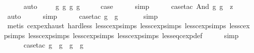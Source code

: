 \begin{isabellebody}
\ \ \ \ \isamarkupfalse%
\ auto\isanewline
{}\isamarkupfalse%
\isanewline
\ \ \isamarkupfalse%
\ {\isacharparenleft}{}{}\ g{}\ g{}\ g{}{\isacharprime}\ g{}{\isacharprime}{\isacharparenright}\isanewline
\ \ \isamarkupfalse%
\ \isamarkupfalse%
\ {\isacharquery}case\isanewline
\ \ \ \ \isamarkupfalse%
\ simp\isanewline
\ \ \ \ \isamarkupfalse%
\ {\isacharparenleft}case{\isacharunderscore}tac\ {\isachardoublequoteopen}And\ g{}{\isacharprime}\ g{}{\isacharprime}\ {\isacharequal}\ z{\isachardoublequoteclose}{\isacharparenright}\isanewline
\ \ \ \ \ \isamarkupfalse%
\ auto{\isacharbrackleft}{}{\isacharbrackright}\isanewline
\ \ \ \ \isamarkupfalse%
\ simp\isanewline
\ \ \ \ \isamarkupfalse%
\ {\isacharparenleft}case{\isacharunderscore}tac\ {\isachardoublequoteopen}g{}\ {\isacharless}\ g{}{\isacharprime}{\isachardoublequoteclose}{\isacharparenright}\isanewline
\ \ \ \ \ \isamarkupfalse%
\ simp\isanewline
\ \ \ \ \ \isamarkupfalse%
\ {\isacharparenleft}metis\ cexp{\isachardot}exhaust\ hard{\isacharunderscore}less\ less{\isacharunderscore}cexp{\isachardot}simps{\isacharparenleft}{}{}{\isacharparenright}\ less{\isacharunderscore}cexp{\isachardot}simps{\isacharparenleft}{}{}{\isacharparenright}\ less{\isacharunderscore}cexp{\isachardot}simps{\isacharparenleft}{}{}{\isacharparenright}\ less{\isacharunderscore}cexp{\isachardot}simps{\isacharparenleft}{}{}{\isacharparenright}\ less{\isacharunderscore}cexp{\isachardot}simps{\isacharparenleft}{}{}{\isacharparenright}\ less{\isacharunderscore}cexp{\isachardot}simps{\isacharparenleft}{}{}{\isacharparenright}\ less{\isacharunderscore}cexp{\isachardot}simps{\isacharparenleft}{}{\isacharparenright}\ less{\isacharunderscore}eq{\isacharunderscore}cexp{\isacharunderscore}def{\isacharparenright}\isanewline
\ \ \ \ \isamarkupfalse%
\ simp\isanewline
\ \ \ \ \isamarkupfalse%
\ {\isacharparenleft}case{\isacharunderscore}tac\ {\isachardoublequoteopen}g{}\ {\isacharequal}\ g{}{\isacharprime}\ {\isasymand}\ g{}\ {\isacharless}\ g{}{\isacharprime}{\isachardoublequoteclose}{\isacharparenright}\isanewline

\end{isabellebody}

